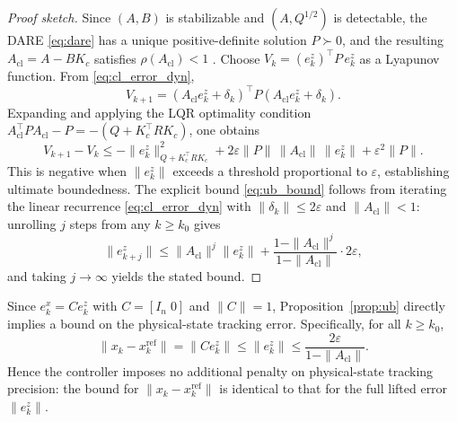 \documentclass[journal]{IEEEtran}
\begin{document}
\begin{proof}[Proof sketch]
Since $(A,B)$ is stabilizable and $(A,Q^{1/2})$ is detectable, the DARE \eqref{eq:dare} has a unique positive-definite solution $P \succ 0$, and the resulting $A_{\mathrm{cl}} = A - BK_c$ satisfies $\rho(A_{\mathrm{cl}}) < 1$ \cite{korda2018linear}. Choose $V_k = (e_k^z)^\top P\, e_k^z$ as a Lyapunov function. From \eqref{eq:cl_error_dyn},
\begin{equation}
    V_{k+1} = (A_{\mathrm{cl}} e_k^z + \delta_k)^\top P (A_{\mathrm{cl}} e_k^z + \delta_k).
\end{equation}
Expanding and applying the LQR optimality condition $A_{\mathrm{cl}}^\top P A_{\mathrm{cl}} - P = -(Q + K_c^\top R K_c)$, one obtains
\begin{equation}
    V_{k+1} - V_k \leq -\|e_k^z\|_{Q+K_c^\top R K_c}^2 + 2\varepsilon \|P\|\,\|A_{\mathrm{cl}}\|\,\|e_k^z\| + \varepsilon^2 \|P\|.
\end{equation}
This is negative when $\|e_k^z\|$ exceeds a threshold proportional to $\varepsilon$, establishing ultimate boundedness. The explicit bound \eqref{eq:ub_bound} follows from iterating the linear recurrence \eqref{eq:cl_error_dyn} with $\|\delta_k\| \leq 2\varepsilon$ and $\|A_{\mathrm{cl}}\| < 1$: unrolling $j$ steps from any $k \geq k_0$ gives
\begin{equation}
    \|e_{k+j}^z\| \leq \|A_{\mathrm{cl}}\|^j \|e_k^z\| + \frac{1 - \|A_{\mathrm{cl}}\|^j}{1 - \|A_{\mathrm{cl}}\|}\cdot 2\varepsilon,
\end{equation}
and taking $j\to\infty$ yields the stated bound.
\end{proof}

Since $e_k^x = Ce_k^z$ with $C=[I_n\;0]$ and $\|C\|=1$, Proposition~\ref{prop:ub} directly implies a bound on the physical-state tracking error. Specifically, for all $k \geq k_0$,
\begin{equation}
    \|x_k - x_k^{\mathrm{ref}}\| = \|C e_k^z\| \leq \|e_k^z\| \leq \frac{2\varepsilon}{1 - \|A_{\mathrm{cl}}\|}.
    \label{eq:phys_bound}
\end{equation}
Hence the controller imposes no additional penalty on physical-state tracking precision: the bound for $\|x_k - x_k^{\mathrm{ref}}\|$ is identical to that for the full lifted error $\|e_k^z\|$.
\end{document}
